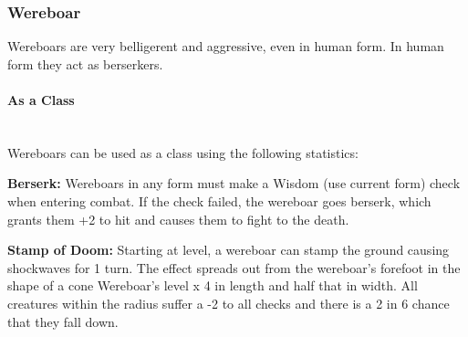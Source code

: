 \begin{multicols*}{2}
\subsubsection{Wereboar}

Wereboars are very belligerent and aggressive, even in human form. In human form they act as berserkers.

\paragraph{As a Class}\mbox{}\\
Wereboars can be used as a class using the following statistics:

\textbf{Berserk:} Wereboars in any form must make a Wisdom (use current form) check when entering combat. If the check failed, the wereboar goes berserk, which grants them +2 to hit and causes them to fight to the death.

\textbf{Stamp of Doom:} Starting at  level, a wereboar can stamp the ground causing shockwaves for 1 turn. The effect spreads out from the wereboar's forefoot in the shape of a cone Wereboar's level x 4 in length and half that in width. All creatures within the radius suffer a -2 to all checks and there is a 2 in 6 chance that they fall down.

\end{multicols*}
